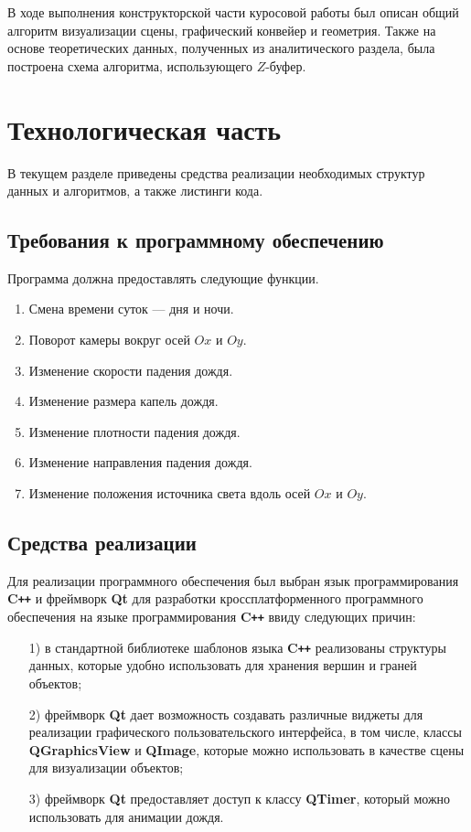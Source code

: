 В ходе выполнения конструкторской части куросовой работы был описан общий алгоритм визуализации сцены, графический конвейер и геометрия. 
Также на основе теоретических данных, полученных из аналитического раздела, была построена схема алгоритма, использующего $Z$-буфер.

\chapter{Технологическая часть}

В текущем разделе приведены средства реализации необходимых структур данных и алгоритмов, а также листинги кода.

\section{Требования к программному обеспечению}

Программа должна предоставлять следующие функции.
\begin{enumerate}
\item
Смена времени суток --- дня и ночи.
\item
Поворот камеры вокруг осей $Ox$ и $Oy$.
\item
Изменение скорости падения дождя.
\item
Изменение размера капель дождя.
\item
Изменение плотности падения дождя.
\item
Изменение направления падения дождя.
\item
Изменение положения источника света вдоль осей $Ox$ и $Oy$.
\end{enumerate}

\section{Средства реализации}

Для реализации программного обеспечения был выбран язык программирования \textbf{C\texttt{++}} и фреймворк \textbf{Qt} для разработки кроссплатформенного программного обеспечения на языке программирования \textbf{C\texttt{++}} ввиду следующих причин:
\begin{enumerate}
\item[1)] в стандартной библиотеке шаблонов языка \textbf{C\texttt{++}} реализованы структуры данных, которые удобно использовать для хранения вершин и граней объектов;
\item[2)] фреймворк \textbf{Qt} дает возможность создавать различные виджеты для реализации графического пользовательского интерфейса, в том числе, классы \textbf{QGraphicsView} и \textbf{QImage}, которые можно использовать в качестве сцены для визуализации объектов;
\item[3)] фреймворк \textbf{Qt} предоставляет доступ к классу \textbf{QTimer}, который можно использовать для анимации дождя.
\end{enumerate}

